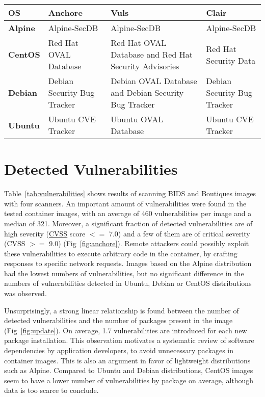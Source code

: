 \begin{center}
\tabulinesep=1.2mm
\begin{tabu} to \textwidth { | X[l] | X[l] | X[l] | X[l] | }
 \hline
\textbf{OS} &   \textbf{Anchore} &      \textbf{Vuls} & \textbf{Clair} \\
\hline
        \textbf{Alpine} & Alpine-SecDB &        Alpine-SecDB &  Alpine-SecDB \\
\hline
        \textbf{CentOS} & Red Hat OVAL Database & Red Hat OVAL Database and Red Hat Security Advisories & Red Hat Security Data \\
\hline
        \textbf{Debian} & Debian Security Bug Tracker & Debian OVAL Database and Debian Security Bug Tracker & Debian Security Bug Tracker \\
\hline
        \textbf{Ubuntu} & Ubuntu CVE Tracker &  Ubuntu OVAL Database &  Ubuntu CVE Tracker \\
 \hline
\end{tabu}
\label{tab:databases}
\end{center}
\addtocounter{table}{-1}
\section{Detected Vulnerabilities}

Table~\ref{tab:vulnerabilities} shows results of scanning BIDS and Boutiques 
images with four scanners. 
An important amount of vulnerabilities were found in the tested container
images, with an average of 460 vulnerabilities
per image and a median of 321.
Moreover, a significant fraction of detected vulnerabilities are
of high severity
(\href{https://www.first.org/cvss/specification-document}{CVSS} score
\(<=\)
7.0) and a few of them are of critical severity (CVSS \(>=\) 9.0)
(Fig~\ref{fig:anchore}). Remote
attackers could possibly exploit these vulnerabilities to execute
arbitrary code in the container, by crafting responses to specific network
requests. Images based on the Alpine distribution
had the lowest numbers of vulnerabilities, but no significant difference
in the numbers of vulnerabilities detected in
Ubuntu, Debian or CentOS distributions was observed.

Unsurprisingly, a strong linear relationship is found between the number of
detected vulnerabilities and the number of packages present in the
image (Fig~\ref{fig:update}). On average, 1.7 vulnerabilities are introduced for
each new package installation. This observation motivates a systematic
review of software dependencies by application developers, to avoid
unnecessary packages in container images. This is also an argument in favor of lightweight
distributions such as Alpine. Compared to Ubuntu and Debian distributions,
CentOS images seem to have a lower number of vulnerabilities by package on
average, although data is too scarce to conclude.

